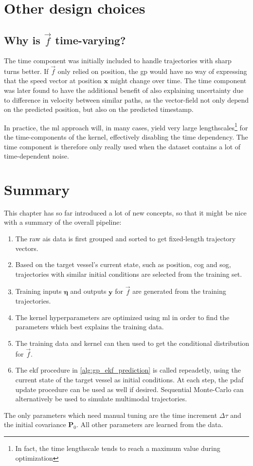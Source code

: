 \section{Other design choices}



\subsection{Why is $\vec{f}$ time-varying?}
The time component was initially included to handle trajectories with sharp turns better. If $\vec{f}$ only relied on position, the \acrshort{gp} would have no way of expressing that the speed vector at position $\boldsymbol{x}$ might change over time. The time component was later found to have the additional benefit of also explaining uncertainty due to difference in velocity between similar paths, as the vector-field not only depend on the predicted position, but also on the predicted timestamp.

In practice, the \acrshort{ml} approach will, in many cases, yield very large lengthscales\footnote{In fact, the time lengthscale tends to reach a maximum value during optimization} for the time-components of the kernel, effectively disabling the time dependency. The time component is therefore only really used when the dataset contains a lot of time-dependent noise.

\section{Summary}
This chapter has so far introduced a lot of new concepts, so that it might be nice with a summary of the overall pipeline:

\begin{enumerate}
    \item The raw \acrshort{ais} data is first grouped and sorted to get fixed-length trajectory vectors.
    \item Based on the target vessel's current state, such as position, \acrshort{cog} and \acrshort{sog}, trajectories with similar initial conditions are selected from the training set.
    \item Training inputs $\boldsymbol{\eta}$ and outputs $\boldsymbol{y}$ for $\vec{f}$ are generated from the training trajectories.
    \item The kernel hyperparameters are optimized using \acrshort{ml} in order to find the parameters which best explains the training data.
    \item The training data and kernel can then used to get the conditional distribution for $\vec{f}$.
    \item The \acrshort{ekf} procedure in \cref{alg:gp_ekf_prediction} is called repeadetly, using the current state of the target vessel as initial conditions. At each step, the \acrshort{pdaf} update procedure can be used as well if desired. Sequential Monte-Carlo can alternatively be used to simulate multimodal trajectories.
\end{enumerate}

The only parameters which need manual tuning are the time increment $\Delta \tau$ and the initial covariance $\boldsymbol{P}_0$. All other parameters are learned from the data. 

